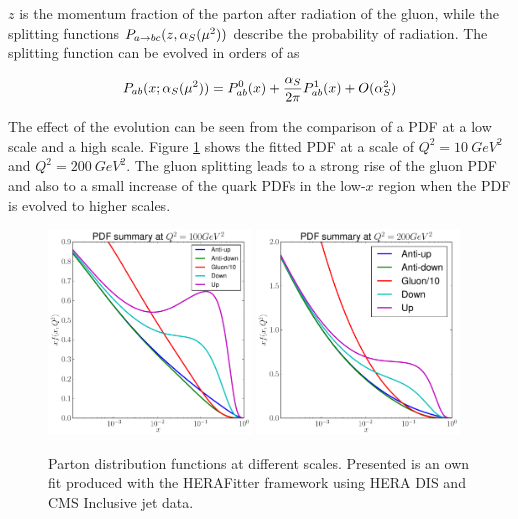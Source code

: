 $z$ is the momentum fraction of the parton after radiation of the gluon, while the splitting functions $P_{a \rightarrow bc}(z,\alpha_S(\mu^2))$ describe the probability of radiation. The splitting function can be evolved in orders of \as as

\begin{equation}
P_{ab}(x;\alpha_S(\mu^2)) = P_{ab}^0(x) + \frac{\alpha_S}{2\pi}P_{ab}^1(x) + O(\alpha_S^2)
\end{equation}


The effect of the evolution can be seen from the comparison of a PDF at a low scale and a high scale. Figure \ref{fig:pdffit} shows the fitted PDF at a scale of $Q^2 = \SI{10}{GeV^2}$ and $Q^2 = \SI{200}{GeV^2}$. The gluon splitting leads to a strong rise of the gluon PDF and also to a small increase of the quark PDFs in the low-$x$ region when the PDF is evolved to higher scales.

\begin{figure}[htb]
\centering
\includegraphics[width=0.48\textwidth]{figures/sm_model/summary_10.pdf}
\includegraphics[width=0.48\textwidth]{figures/sm_model/summary_200.pdf}
\caption[Parton distribution functions.]{Parton distribution functions at different scales. Presented is an own fit produced with the HERAFitter framework using HERA DIS and CMS Inclusive jet data.}
\label{fig:pdffit}
\end{figure}

